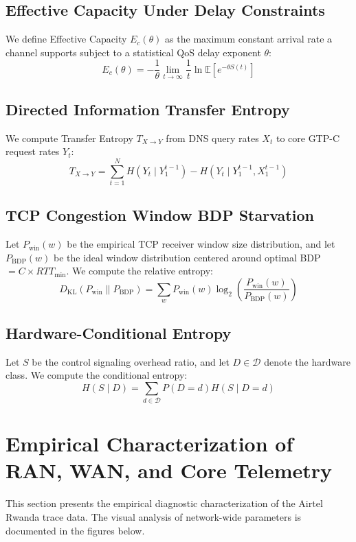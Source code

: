 \documentclass[journal]{IEEEtran}
\begin{document}
\subsection{Effective Capacity Under Delay Constraints}
We define Effective Capacity $E_c(\theta)$ as the maximum constant arrival rate a channel supports subject to a statistical QoS delay exponent $\theta$:
\begin{equation}
E_c(\theta) = -\frac{1}{\theta} \lim_{t \to \infty} \frac{1}{t} \ln \mathbb{E}\left[ e^{-\theta S(t)} \right]
\end{equation}

\subsection{Directed Information Transfer Entropy}
We compute Transfer Entropy $T_{X \to Y}$ from DNS query rates $X_t$ to core GTP-C request rates $Y_t$:
\begin{equation}
T_{X \to Y} = \sum_{t=1}^{N} H(Y_t \mid Y_1^{t-1}) - H(Y_t \mid Y_1^{t-1}, X_1^{t-1})
\end{equation}

\subsection{TCP Congestion Window BDP Starvation}
Let $P_{\text{win}}(w)$ be the empirical TCP receiver window size distribution, and let $P_{\text{BDP}}(w)$ be the ideal window distribution centered around optimal BDP $= C \times RTT_{\text{min}}$. We compute the relative entropy:
\begin{equation}
D_{\text{KL}}(P_{\text{win}} \parallel P_{\text{BDP}}) = \sum_{w} P_{\text{win}}(w) \log_2 \left( \frac{P_{\text{win}}(w)}{P_{\text{BDP}}(w)} \right)
\end{equation}

\subsection{Hardware-Conditional Entropy}
Let $S$ be the control signaling overhead ratio, and let $D \in \mathcal{D}$ denote the hardware class. We compute the conditional entropy:
\begin{equation}
H(S \mid D) = \sum_{d \in \mathcal{D}} P(D=d) H(S \mid D=d)
\end{equation}

\section{Empirical Characterization of RAN, WAN, and Core Telemetry}
This section presents the empirical diagnostic characterization of the Airtel Rwanda trace data. The visual analysis of network-wide parameters is documented in the figures below.
\end{document}

